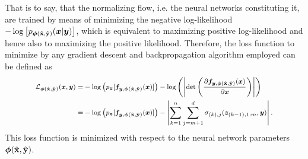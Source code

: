 \documentclass[a4paper,12pt]{report}
\begin{document}
That is to say, that the normalizing flow, i.e. the neural networks constituting it, are trained by means of minimizing the negative log-likelihood $-\log\left[p_{\bm{\phi}(\hat{\boldsymbol{\mathbf{x}}},\hat{\boldsymbol{\mathbf{y}}})}(\bm{x}|\bm{y})\right]$, which is equivalent to maximizing positive log-likelihood and hence also to maximizing the positive likelihood. Therefore, the loss function to minimize by any gradient descent and backpropagation algorithm employed can be defined as 
\begin{align}\footnotesize
\begin{aligned}
\mathcal{L}_{\bm{\phi}(\hat{\boldsymbol{\mathbf{x}}},\hat{\boldsymbol{\mathbf{y}}})}(\bm{x},\bm{y}) =&  -\log\left(p_{\bm{z}}[\bm{f}_{\bm{y},\bm{\phi}(\hat{\boldsymbol{\mathbf{x}}},\hat{\boldsymbol{\mathbf{y}}})}(\bm{x})]\right) - \log\left(\left|\det\left(\frac{\partial \bm{f}_{\bm{y},\bm{\phi}(\hat{\boldsymbol{\mathbf{x}}},\hat{\boldsymbol{\mathbf{y}}})}(\bm{x})}{\partial \bm{x}}\right)\right|\right) \\
=& -\log\left(p_{\bm{z}}[\bm{f}_{\bm{y},\bm{\phi}(\hat{\boldsymbol{\mathbf{x}}},\hat{\boldsymbol{\mathbf{y}}})}(\bm{x})]\right) - \left|\sum_{k = 1}^{n}\sum_{j = m+1}^{d}\sigma_{(k),j}(\bm{z}_{(k-1),1:m},\bm{y})\right|.
\end{aligned}
\end{align} This loss function is minimized with respect to the neural network parameters $\bm{\phi}(\hat{\boldsymbol{\mathbf{x}}},\hat{\boldsymbol{\mathbf{y}}})$.


%
%
\end{document}
